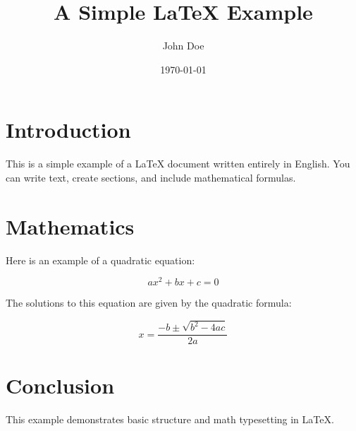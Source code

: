 \documentclass{article}
\title{A Simple LaTeX Example}
\author{John Doe}
\date{\today}
\begin{document}
\maketitle

\section{Introduction}

This is a simple example of a \LaTeX{} document written entirely in English.
You can write text, create sections, and include mathematical formulas.

\section{Mathematics}

Here is an example of a quadratic equation:

\[
ax^2 + bx + c = 0
\]

The solutions to this equation are given by the quadratic formula:

\[
x = \frac{-b \pm \sqrt{b^2 - 4ac}}{2a}
\]

\section{Conclusion}

This example demonstrates basic structure and math typesetting in \LaTeX.
\end{document}
